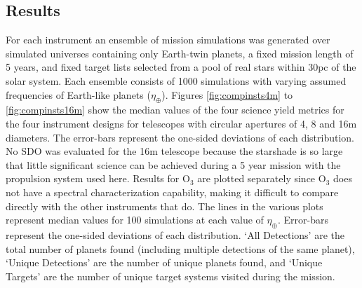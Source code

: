 \subsection{Results}
For each instrument an ensemble of mission simulations was generated over simulated universes containing only Earth-twin planets, a fixed mission length of 5 years, and fixed target lists selected from a pool of real stars within 30pc of the solar system.  Each ensemble consists of 1000 simulations with varying assumed frequencies of Earth-like planets ($\eta_\oplus$). Figures \ref{fig:compinsts4m} to \ref{fig:compinsts16m} show the median values of the four science yield metrics for the four instrument designs for telescopes with circular apertures of 4, 8 and 16m diameters.  The error-bars represent the one-sided deviations of each distribution.  No SDO was evaluated for the 16m telescope because the starshade is so large that little significant science can be achieved during a 5 year mission with the propulsion system used here.  Results for O$_3$ are plotted separately since O$_3$ does not have a spectral characterization capability, making it difficult to compare directly with the other instruments that do.  The lines in the various plots represent median values for 100 simulations at each value of $\eta_\oplus$.  Error-bars represent the one-sided deviations of each distribution.  `All Detections'  are the total number of planets found (including multiple detections of the same planet), `Unique Detections' are the number of unique planets found, and `Unique Targets' are the number of unique target systems visited during the mission.

